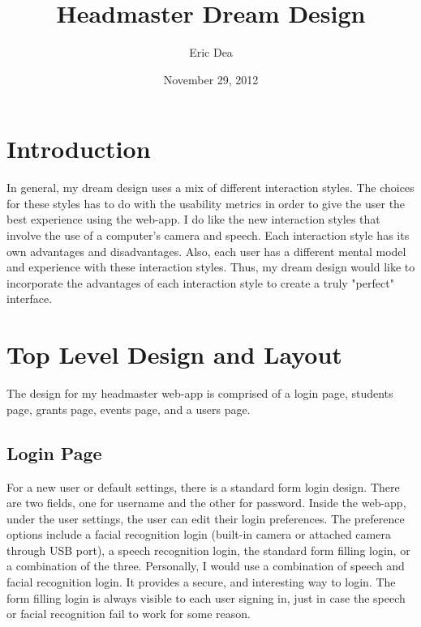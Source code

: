 \documentclass{article}
\title{Headmaster Dream Design}
\author{Eric Dea}
\date{November 29, 2012}
\begin{document}
\maketitle


\pagebreak
\tableofcontents

\pagebreak
\listoffigures

\pagebreak

%
%
\section{Introduction}
\label{introduction}

In general, my dream design uses a mix of different interaction styles.  The choices for these styles has to do with the usability metrics in order to give the user the best experience using the web-app.  I do like the new interaction styles that involve the use of a computer's camera and speech.  Each interaction style has its own advantages and disadvantages.  Also, each user has a different mental model and experience with these interaction styles.  Thus, my dream design would like to incorporate the advantages of each interaction style to create a truly "perfect" interface.

\section{Top Level Design and Layout}

The design for my headmaster web-app is comprised of a login page, students page, grants page, events page, and a users page.

\subsection{Login Page}

For a new user or default settings, there is a standard form login design.  There are two fields, one for username and the other for password.  Inside the web-app, under the user settings, the user can edit their login preferences.  The preference options include a facial recognition login (built-in camera or attached camera through USB port), a speech recognition \cite{sphinx} login, the standard form filling login, or a combination of the three. Personally, I would use a combination of speech and facial recognition login. It provides a secure, and interesting way to login.  The form filling login is always visible to each user signing in, just in case the speech or facial recognition fail to work for some reason.
\end{document}
